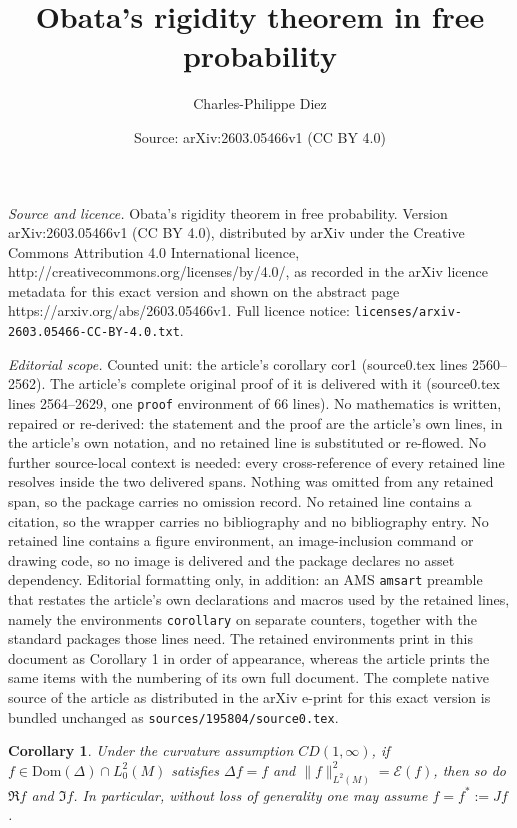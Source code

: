 \documentclass[10pt,a4paper]{amsart}
\title{Obata's rigidity theorem in free probability}
\author{Charles-Philippe Diez}
\date{Source: arXiv:2603.05466v1 (CC BY 4.0)}
\newtheorem{corollary}{Corollary}
\newcommand{\Dom}{\mathrm{Dom}}
\begin{document}
\maketitle

\noindent\emph{Source and licence.} Obata's rigidity theorem in free probability. Version arXiv:2603.05466v1 (CC BY 4.0), distributed by arXiv under the Creative Commons Attribution 4.0 International licence, http://creativecommons.org/licenses/by/4.0/, as recorded in the arXiv licence metadata for this exact version and shown on the abstract page https://arxiv.org/abs/2603.05466v1. Full licence notice: \texttt{licenses/arxiv-2603.05466-CC-BY-4.0.txt}.\par\smallskip

\noindent\textit{Editorial scope.} Counted unit: the article's corollary cor1 (source0.tex lines 2560--2562). The article's complete original proof of it is delivered with it (source0.tex lines 2564--2629, one \texttt{proof} environment of 66 lines). No mathematics is written, repaired or re-derived: the statement and the proof are the article's own lines, in the article's own notation, and no retained line is substituted or re-flowed.  No further source-local context is needed: every cross-reference of every retained line resolves inside the two delivered spans.  Nothing was omitted from any retained span, so the package carries no omission record.  No retained line contains a citation, so the wrapper carries no bibliography and no bibliography entry.  No retained line contains a figure environment, an image-inclusion command or drawing code, so no image is delivered and the package declares no asset dependency.  Editorial formatting only, in addition: an AMS \texttt{amsart} preamble that restates the article's own declarations and macros used by the retained lines, namely the environments \texttt{corollary} on separate counters, together with the standard packages those lines need.  The retained environments print in this document as Corollary 1 in order of appearance, whereas the article prints the same items with the numbering of its own full document.  The complete native source of the article as distributed in the arXiv e-print for this exact version is bundled unchanged as \texttt{sources/195804/source0.tex}.
\begin{corollary}\label{cor1}
Under the curvature assumption $CD(1,\infty)$, if $f\in \Dom(\Delta)\cap L^2_0(M)$ satisfies $\Delta f=f$ and $\|f\|_{L^2(M)}^2=\mathcal{E}(f)$, then so do $\Re f$ and $\Im f$. In particular, without loss of generality one may assume $f=f^\ast:=Jf$.
\end{corollary}
\end{document}

